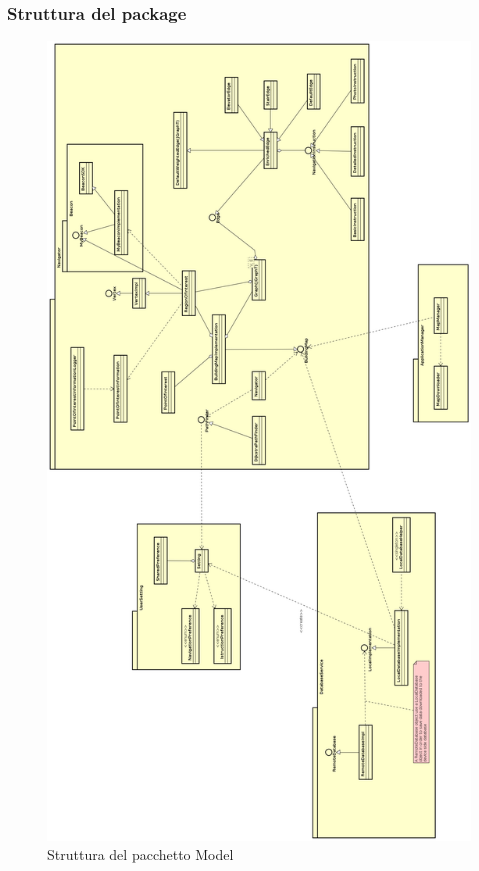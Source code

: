 \documentclass[../SpecificaTecnica.tex]{subfiles}
\begin{document}
		\subsubsection{Struttura del package}
				\begin{figure}[!h]
					\centering
					\includegraphics[scale=0.12]{diagrammi/Model.png}
						\caption{Struttura del pacchetto Model}
					\label{fig:Struttura_MVP}
				\end{figure} 
\end{document}
